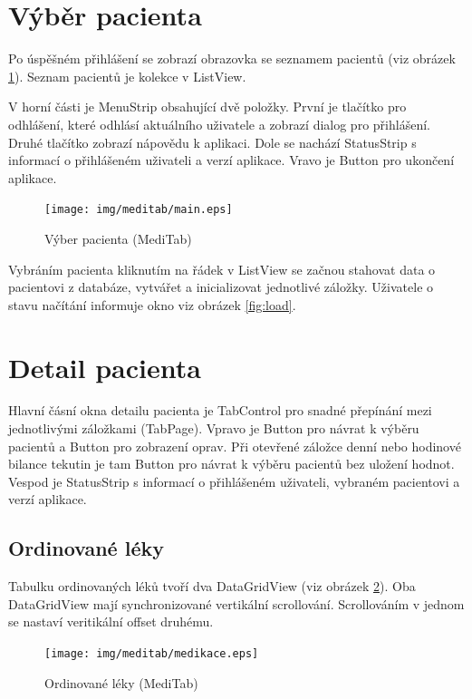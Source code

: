 \section{Výběr pacienta}

Po úspěšném přihlášení se zobrazí obrazovka se seznamem pacientů (viz obrázek \ref{fig:main}). Seznam pacientů je kolekce v ListView.

V horní části je MenuStrip obsahující dvě položky. První je tlačítko pro odhlášení, které odhlásí aktuálního uživatele a zobrazí dialog pro přihlášení. Druhé tlačítko zobrazí nápovědu k aplikaci. Dole se nachází StatusStrip s informací o přihlášeném uživateli a verzí aplikace. Vravo je Button pro ukončení aplikace.

\begin{figure}[H]
	\centering
	\texttt{[image: img/meditab/main.eps]}
	\caption{Výber pacienta (MediTab)}
  \label{fig:main}
\end{figure}


Vybráním pacienta kliknutím na řádek v ListView se začnou stahovat data o pacientovi z databáze, vytvářet a inicializovat jednotlivé záložky. Uživatele o stavu načítání informuje okno viz obrázek \ref{fig:load}.




\section{Detail pacienta}

Hlavní čásní okna detailu pacienta je TabControl pro snadné přepínání mezi jednotlivými záložkami (TabPage). Vpravo je Button pro návrat k výběru pacientů a Button pro zobrazení oprav. Při otevřené záložce denní nebo hodinové bilance tekutin je tam Button pro návrat k výběru pacientů bez uložení hodnot. Vespod je StatusStrip s informací o přihlášeném uživateli, vybraném pacientovi a verzí aplikace.

\subsection{Ordinované léky}

Tabulku ordinovaných léků tvoří dva DataGridView (viz obrázek \ref{fig:medikace}). Oba DataGridView mají synchronizované vertikální scrollování. Scrollováním v jednom se nastaví veritikální offset druhému.

\begin{figure}[H]
	\centering
	\texttt{[image: img/meditab/medikace.eps]}
	\caption{Ordinované léky (MediTab)}
  \label{fig:medikace}
\end{figure}

